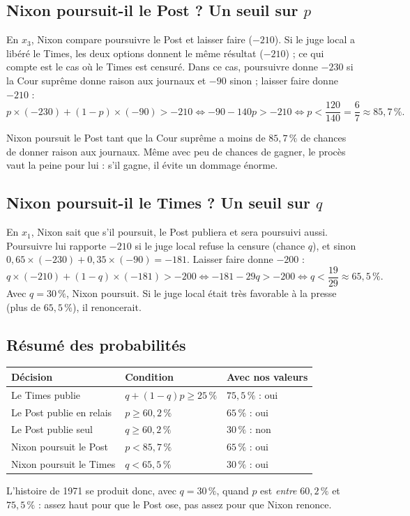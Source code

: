 \documentclass[11pt,a4paper]{article}
\theoremstyle{definition}
\begin{document}
\subsection{Nixon poursuit-il le Post ? Un seuil sur $p$}
En $x_3$, Nixon compare poursuivre le Post et laisser faire ($-210$). Si le juge local a libéré le Times, les deux options donnent le même résultat ($-210$) ; ce qui compte est le cas où le Times est censuré. Dans ce cas, poursuivre donne $-230$ si la Cour suprême donne raison aux journaux et $-90$ sinon ; laisser faire donne $-210$ :
\[
p\times(-230)+(1-p)\times(-90)>-210\iff -90-140p>-210\iff p<\frac{120}{140}=\frac67\approx85,7\,\% .
\]
\begin{simple}
Nixon poursuit le Post tant que la Cour suprême a moins de $85,7\,\%$ de chances de donner raison aux journaux. Même avec peu de chances de gagner, le procès vaut la peine pour lui : s'il gagne, il évite un dommage énorme.
\end{simple}

\subsection{Nixon poursuit-il le Times ? Un seuil sur $q$}
En $x_1$, Nixon sait que s'il poursuit, le Post publiera et sera poursuivi aussi. Poursuivre lui rapporte $-210$ si le juge local refuse la censure (chance $q$), et sinon $0,65\times(-230)+0,35\times(-90)=-181$. Laisser faire donne $-200$ :
\[
q\times(-210)+(1-q)\times(-181)>-200\iff -181-29q>-200\iff q<\frac{19}{29}\approx65,5\,\% .
\]
Avec $q=30\,\%$, Nixon poursuit. Si le juge local était très favorable à la presse (plus de $65,5\,\%$), il renoncerait.

\subsection{Résumé des probabilités}
\begin{center}
\small
\begin{tabular}{@{}lll@{}}
\toprule
Décision & Condition & Avec nos valeurs \\
\midrule
Le Times publie & $q+(1-q)p\ge25\,\%$ & $75,5\,\%$ : oui \\
Le Post publie en relais & $p\ge60,2\,\%$ & $65\,\%$ : oui \\
Le Post publie seul & $q\ge60,2\,\%$ & $30\,\%$ : non \\
Nixon poursuit le Post & $p<85,7\,\%$ & $65\,\%$ : oui \\
Nixon poursuit le Times & $q<65,5\,\%$ & $30\,\%$ : oui \\
\bottomrule
\end{tabular}
\end{center}
L'histoire de 1971 se produit donc, avec $q=30\,\%$, quand $p$ est \emph{entre} $60,2\,\%$ et $75,5\,\%$ : assez haut pour que le Post ose, pas assez pour que Nixon renonce.
\end{document}
